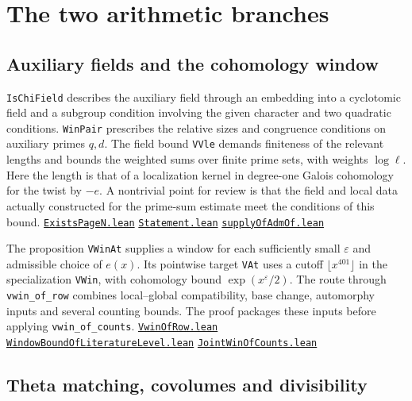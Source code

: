 \documentclass[11pt,a4paper]{article}
\newcommand{\repo}{https://github.com/LiRunGuo/riemann-lean-verification}
\newcommand{\code}[1]{\texttt{#1}}
\newcommand{\src}[2]{\href{\repo/blob/main/lean/src/#1}{\mbox{\nolinkurl{#2}}}}
\newcommand{\cb}{Development/AutomorphicArithmetic/CharacterBoxes}
\newcommand{\dt}{Development/AutomorphicArithmetic/AutomorphicVarieties/ModularityArgument/ThresholdArguments/DenseThresholdCases}
\begin{document}
\clearpage
\section{The two arithmetic branches}

\subsection*{Auxiliary fields and the cohomology window}

\code{IsChiField} describes the auxiliary field through an embedding into
a cyclotomic field and a subgroup condition involving the given character
and two quadratic conditions. \code{WinPair} prescribes the relative sizes
and congruence conditions on auxiliary primes $q,d$. The field bound
\code{VVle} demands finiteness of the relevant lengths and bounds the
weighted sums over finite prime sets, with weights $\log\ell$.
Here the length is that of a localization kernel in degree-one Galois
cohomology for the twist by $-e$. A nontrivial point for review is that
the field and local data actually constructed for the prime-sum estimate
meet the conditions of this bound.
\src{\cb/ExistsPageN.lean}{ExistsPageN.lean}
\src{Formalism/GaloisCohomology/Statement.lean}{Statement.lean}
\src{Development/AutomorphicArithmetic/ShortNorms/supplyOfAdmOf.lean}{supplyOfAdmOf.lean}

The proposition \code{VWinAt} supplies a window for each sufficiently small
$\varepsilon$ and admissible choice of $e(x)$. Its pointwise target
\code{VAt} uses a cutoff $\lfloor x^{401}\rfloor$ in the specialization
\code{VWin}, with cohomology bound $\exp(x^\varepsilon/2)$.
The route through \code{vwin\_of\_row} combines local--global compatibility,
base change, automorphy inputs and several counting bounds. The proof
packages these inputs before applying \code{vwin\_of\_counts}.
\src{\dt/VwinOfRow.lean}{VwinOfRow.lean}
\src{\dt/WindowBoundOfLiteratureLevel.lean}{WindowBoundOfLiteratureLevel.lean}
\src{Development/AutomorphicArithmetic/AutomorphicVarieties/HeightAndVanishing/JointWinOfCounts.lean}{JointWinOfCounts.lean}

\subsection*{Theta matching, covolumes and divisibility}
\end{document}
